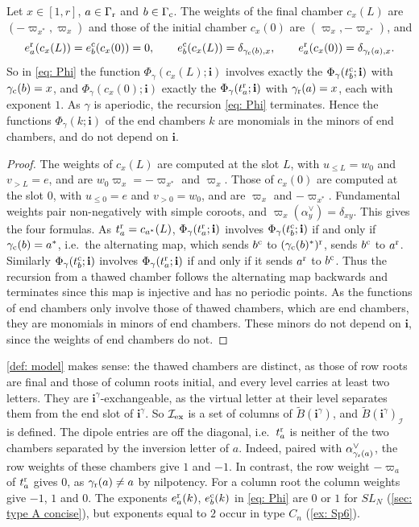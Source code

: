 \documentclass[a4paper]{amsart}
\numberwithin{equation}{section}
\theoremstyle{definition}
\theoremstyle{remark}
\newcommand{\mcI}{\mathcal{I}}
\newcommand{\bfi}{\mathbf{i}}
\newcommand{\tB}{\widetilde{B}}
\newcommand{\rr}{{\rm r}}
\newcommand{\cc}{{\rm c}}
\newcommand{\ex}{{\rm ex}}
\begin{document}
\begin{lemma}
  \label{lem: tails}
  Let $x\in[1,r]$, $a\in\Gamma_{\rr}$ and $b\in\Gamma_{\cc}$.
  The weights of the final chamber $c_x(L)$ are $(-\varpi_{x^*},\varpi_x)$ and those of the initial chamber $c_x(0)$ are $(\varpi_x,-\varpi_{x^*})$, and
  \[
    e^\rr_a(c_x(L))=e^\cc_b(c_x(0))=0,
    \qquad
    e^\cc_b(c_x(L))=\delta_{\gamma_{\cc}(b),x},
    \qquad
    e^\rr_a(c_x(0))=\delta_{\gamma_{\rr}(a),x}.
  \]
  So in \eqref{eq: Phi} the function $\Phi_\gamma(c_x(L);\bfi)$ involves exactly the $\Phi_\gamma(t^\cc_b;\bfi)$ with $\gamma_{\cc}(b)=x$, and $\Phi_\gamma(c_x(0);\bfi)$ exactly the $\Phi_\gamma(t^\rr_a;\bfi)$ with $\gamma_{\rr}(a)=x$, each with exponent $1$.
  As $\gamma$ is aperiodic, the recursion \eqref{eq: Phi} terminates.
  Hence the functions $\Phi_\gamma(k;\bfi)$ of the end chambers $k$ are monomials in the minors of end chambers, and do not depend on $\bfi$.
\end{lemma}
\begin{proof}

  The weights of $c_x(L)$ are computed at the slot $L$, with $u_{\le L}=w_0$ and $v_{>L}=e$, and are $w_0\varpi_x=-\varpi_{x^*}$ and $\varpi_x$.
  Those of $c_x(0)$ are computed at the slot $0$, with $u_{\le0}=e$ and $v_{>0}=w_0$, and are $\varpi_x$ and $-\varpi_{x^*}$.
  Fundamental weights pair non-negatively with simple coroots, and $\varpi_x(\alpha^\vee_y)=\delta_{xy}$. This gives the four formulas.
  As $t^\rr_a=c_{a^*}(L)$, $\Phi_\gamma(t^\rr_a;\bfi)$ involves $\Phi_\gamma(t^\cc_b;\bfi)$ if and only if $\gamma_{\cc}(b)=a^*$, i.e.\ the alternating map, which sends $b^\cc$ to $(\gamma_{\cc}(b)^*)^\rr$, sends $b^\cc$ to $a^\rr$.
  Similarly $\Phi_\gamma(t^\cc_b;\bfi)$ involves $\Phi_\gamma(t^\rr_a;\bfi)$ if and only if it sends $a^\rr$ to $b^\cc$.
  Thus the recursion from a thawed chamber follows the alternating map backwards and terminates since this map is injective and has no periodic points.
  As the functions of end chambers only involve those of thawed chambers, which are end chambers, they are monomials in minors of end chambers.
  These minors do not depend on $\bfi$, since the weights of end chambers do not.
\end{proof}

\cref{def: model} makes sense: the thawed chambers are distinct, as those of row roots are final and those of column roots initial, and every level carries at least two letters.
They are $\bfi^\gamma$-exchangeable, as the virtual letter at their level separates them from the end slot of $\bfi^\gamma$.
  So $\mcI_\ex$ is a set of columns of $\tB(\bfi^\gamma)$, and $\tB(\bfi^\gamma)_\mcI$ is defined.
The dipole entries are off the diagonal, i.e.\ $t^\rr_a$ is neither of the two chambers separated by the inversion letter of $a$.
Indeed, paired with $\alpha^\vee_{\gamma_{\rr}(a)}$, the row weights of these chambers give $1$ and $-1$.
In contrast, the row weight $-\varpi_a$ of $t^\rr_a$ gives $0$, as $\gamma_{\rr}(a)\neq a$ by nilpotency.
For a column root the column weights give $-1$, $1$ and $0$.
The exponents $e^\rr_a(k)$, $e^\cc_b(k)$ in \eqref{eq: Phi} are $0$ or $1$ for $SL_N$ (\cref{sec: type A concise}), but exponents equal to $2$ occur in type $C_n$ (\cref{ex: Sp6}).
\end{document}
